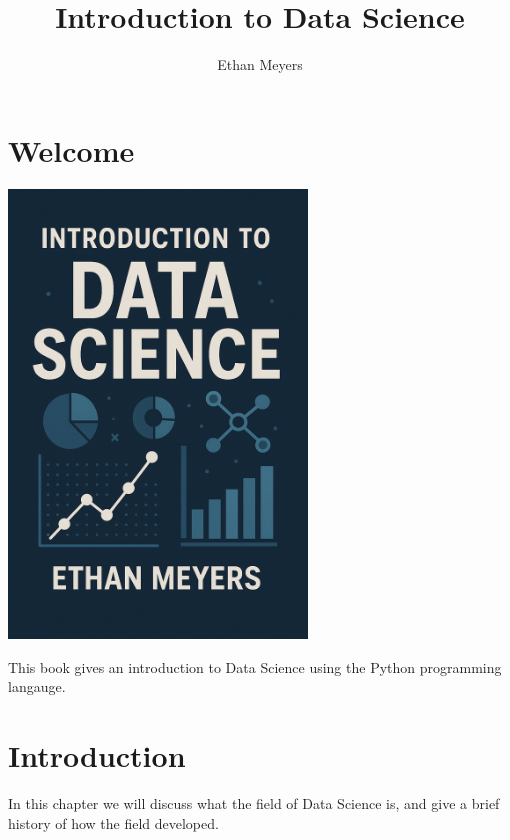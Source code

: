 \documentclass[
  letterpaper,
  DIV=11,
  numbers=noendperiod]{scrreprt}
\title{Introduction to Data Science}
\author{Ethan Meyers}
\date{}
\renewcommand*\contentsname{Table of contents}
\newcommand\contentsname{Table of contents}
\begin{document}
\maketitle

\renewcommand*\contentsname{Table of contents}
{
\hypersetup{linkcolor=}
\setcounter{tocdepth}{2}
\tableofcontents
}


\chapter*{Welcome}\label{welcome}


\includegraphics[width=3.125in,height=\textheight,keepaspectratio]{images/cover_img.png}

This book gives an introduction to Data Science using the Python
programming langauge.


\chapter{Introduction}\label{introduction}

In this chapter we will discuss what the field of Data Science is, and
give a brief history of how the field developed.
\end{document}
